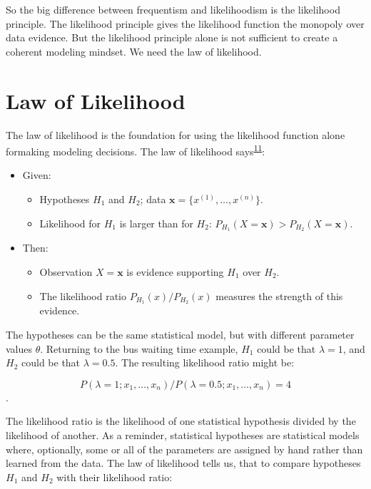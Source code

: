 \documentclass[
  10pt,
]{scrbook}
\providecommand{\tightlist}{%
  \setlength{\itemsep}{0pt}\setlength{\parskip}{0pt}}
\begin{document}
So the big difference between frequentism and likelihoodism is the likelihood principle.
The likelihood principle gives the likelihood function the monopoly over data evidence.
But the likelihood principle alone is not sufficient to create a coherent modeling mindset.
We need the law of likelihood.

\hypertarget{law-of-likelihood}{%
\section{Law of Likelihood}\label{law-of-likelihood}}

The law of likelihood is the foundation for using the likelihood function alone formaking modeling decisions.
The law of likelihood says\textsuperscript{\protect\hyperlink{ref-hacking1965logic}{11}}:

\begin{itemize}
\tightlist
\item
  Given:

  \begin{itemize}
  \tightlist
  \item
    Hypotheses \(H_1\) and \(H_2\); data \(\mathbf{x} = \{x^{(1)}, \dots, x^{(n)}\}\).
  \item
    Likelihood for \(H_1\) is larger than for \(H_2\): \(P_{H_1}(X = \mathbf{x}) > P_{H_2}(X = \mathbf{x})\).
  \end{itemize}
\item
  Then:

  \begin{itemize}
  \tightlist
  \item
    Observation \(X=\mathbf{x}\) is evidence supporting \(H_1\) over \(H_2\).
  \item
    The likelihood ratio \(P_{H_1}(x)/P_{H_2}(x)\) measures the strength of this evidence.
  \end{itemize}
\end{itemize}

The hypotheses can be the same statistical model, but with different parameter values \(\theta\).
Returning to the bus waiting time example, \(H_1\) could be that \(\lambda = 1\), and \(H_2\) could be that \(\lambda = 0.5\).
The resulting likelihood ratio might be:

\[P(\lambda = 1;x_1, \ldots, x_n)/P(\lambda = 0.5;x_1, \ldots, x_n) = 4\].

The likelihood ratio is the likelihood of one statistical hypothesis divided by the likelihood of another.
As a reminder, statistical hypotheses are statistical models where, optionally, some or all of the parameters are assigned by hand rather than learned from the data.
The law of likelihood tells us, that to compare hypotheses \(H_1\) and \(H_2\) with their likelihood ratio:
\end{document}
